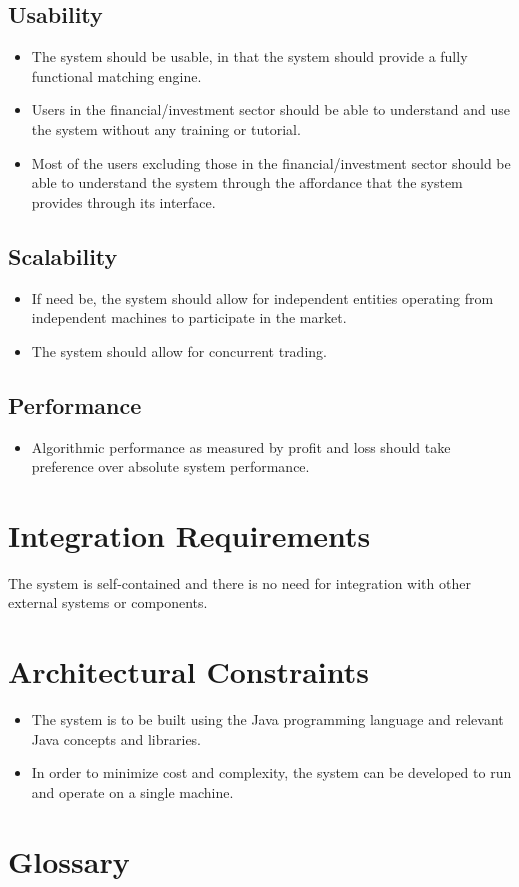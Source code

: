 \documentclass[12pt]{article}
\begin{document}
		\subsection{Usability}
		\begin{itemize}
		\item The system should be usable, in that the system should provide a fully functional matching engine.
		\item Users in the financial/investment sector should be able to understand and use the system without any training or tutorial.
		\item Most of the users excluding those in the financial/investment sector should be able to understand the system through the affordance that the system provides through its interface.
		\end{itemize}
		\subsection{Scalability}
		\begin{itemize}
		\item If need be, the system should allow for independent entities operating from independent machines to participate in the market.
		\item The system should allow for concurrent trading.
		\end{itemize}
		\subsection{Performance}
		\begin{itemize}
		\item Algorithmic performance as measured by profit and loss should take preference over absolute system performance. 
		\end{itemize}
	\section{Integration Requirements}
	The system is self-contained and there is no need for integration with other external systems or components.
	\section{Architectural Constraints}
	\begin{itemize}
	\item The system is to be built using the Java programming language and relevant Java concepts and libraries.
	\item In order to minimize cost and complexity, the system can be developed to run and operate on a single machine. 
	\end{itemize}
		
	\newpage				    
	\section{Glossary}				    			    			    		
\end{document}

